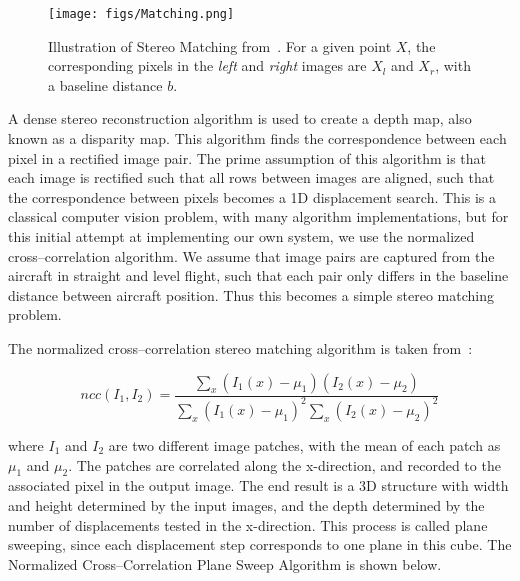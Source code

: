 \documentclass[runningheads]{llncs}
\begin{document}
\begin{figure}
\texttt{[image: figs/Matching.png]}
\caption{Illustration of Stereo Matching from~\cite{solem2012programming}. For a given point $X$, the corresponding pixels in the \emph{left} and \emph{right} images are $X_l$ and $X_r$, with a baseline distance $b$. } \label{fig-Matching}
\end{figure}

A dense stereo reconstruction algorithm is used to create a depth map, also known as a disparity map. This algorithm finds the correspondence between each pixel in a rectified image pair. The prime assumption of this algorithm is that each image is rectified such that all rows between images are aligned, such that the correspondence between pixels becomes a 1D displacement search. This is a classical computer vision problem, with many algorithm implementations, but for this initial attempt at implementing our own system, we use the normalized cross--correlation algorithm. We assume that image pairs are captured from the aircraft in straight and level flight, such that each pair only differs in the baseline distance between aircraft position. Thus this becomes a simple stereo matching problem.

The normalized cross--correlation stereo matching algorithm is taken from~\cite{solem2012programming}:


\[
    ncc(I_{1}, I_{2}) = \frac{\sum_{x}(I_{1}(x) - \mu_{1})(I_{2}(x) - \mu_{2})}{\sum_{x}(I_{1}(x) - \mu_{1})^2 \sum_{x}(I_{2}(x) - \mu_{2})^2}
\]

where $I_{1}$ and $I_{2}$ are two different image patches, with the mean of each patch as $\mu_{1}$ and $\mu_{2}$. The patches are correlated along the x-direction, and recorded to the associated pixel in the output image. The end result is a 3D structure with width and height determined by the input images, and the depth determined by the number of displacements tested in the x-direction. This process is called plane sweeping, since each displacement step corresponds to one plane in this cube. The Normalized Cross--Correlation Plane Sweep Algorithm is shown below.
\end{document}
